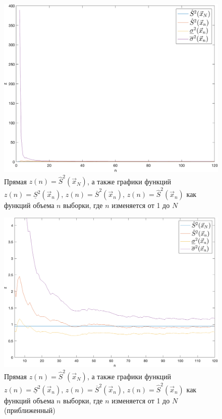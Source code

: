 \documentclass[12pt]{report}
\begin{document}
\begin{figure}[h]
	\centering
	\includegraphics[scale=0.5]{img/2.png}
	\caption{Прямая $z(n) = \hat S^2(\vec x_N)$, а также графики функций $z(n) = \underline S^2(\vec x_n)$, $z(n) = \overline S^2(\vec x_n)$, $z(n) = \hat S^2(\vec x_n)$ как функций объема $n$ выборки, где $n$ изменяется от 1 до $N$}
	\label{fig:2}
\end{figure}

\begin{figure}[h]
	\centering
	\includegraphics[scale=0.5]{img/3.png}
	\caption{Прямая $z(n) = \hat S^2(\vec x_N)$, а также графики функций $z(n) = \underline S^2(\vec x_n)$, $z(n) = \overline S^2(\vec x_n)$, $z(n) = \hat S^2(\vec x_n)$ как функций объема $n$ выборки, где $n$ изменяется от 1 до $N$ (приближенный)}
	\label{fig:3}
\end{figure}

	
\end{document}
